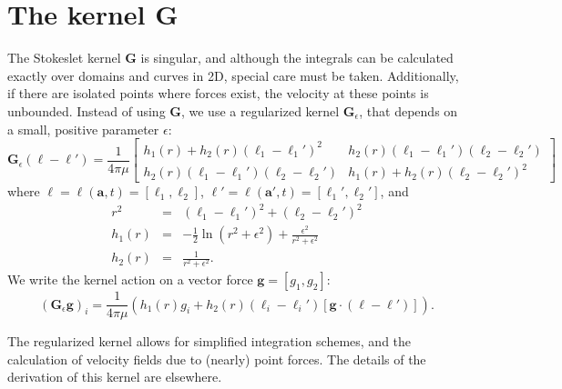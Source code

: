 \documentclass[12pt]{article}
\newcommand{\bee}[1]{\begin{equation} #1 \end{equation}}
\newcommand{\bees}[1]{\begin{equation*} #1 \end{equation*}}
\newcommand{\baas}[1]{\begin{eqnarray*} #1 \end{eqnarray*}}
\newcommand{\ba}{{\mathbf a}}
\newcommand{\bl}{{\pmb \ell}}
\newcommand{\bg}{{\mathbf g}}
\newcommand{\bG}{{\mathbf G}}
\newcommand{\eps}{\epsilon}
\newcommand{\Ge}{\bG_\eps}
\begin{document}
	\section{The kernel $\bG$}
	
	The Stokeslet kernel $\bG$ is singular, and although the integrals can be calculated exactly over domains and curves in 2D, special care must be taken. Additionally, if there are isolated points where forces exist, the velocity at these points is unbounded. Instead of using $\bG$, we use a regularized kernel $\Ge$, that depends on a small, positive parameter $\eps$: 
	\bees{
	\Ge(\bl - \bl') = \frac{1}{4\pi\mu} \begin{bmatrix} h_1(r) + h_2(r)(\ell_1 - \ell_1')^2 & h_2(r)(\ell_1 - \ell_1')(\ell_2 - \ell_2') \\ h_2(r)(\ell_1 - \ell_1')(\ell_2 - \ell_2') & h_1(r) + h_2(r)(\ell_2 - \ell_2')^2 \end{bmatrix} 
	}
	where $\bl = \bl(\ba,t) = [\ell_1, \ell_2]$, $\bl' = \bl(\ba',t) = [\ell_1', \ell_2']$, and 
	\baas{
	r^2 &=& (\ell_1 - \ell_1')^2 + (\ell_2 - \ell_2')^2 \\ 
	h_1(r) &=& - \frac{1}{2}\ln(r^2 + \eps^2)  + \frac{\eps^2}{r^2 + \eps^2} \\
	h_2(r) &=& \frac{1}{r^2 + \eps^2}.
	}
	We write the kernel action on a vector force $\bg=[g_1,g_2]$:
	\bee{
	(\Ge\bg)_i = \frac{1}{4\pi\mu} \left(  h_1(r) g_i + h_2(r)(\ell_i - \ell_i')[\bg \cdot (\bl - \bl')] \right).\label{eqn:kernact}
	}
	
	The regularized kernel allows for simplified integration schemes, and the calculation of velocity fields due to (nearly) point forces. The details of the derivation of this kernel are elsewhere. 
	
\end{document}
